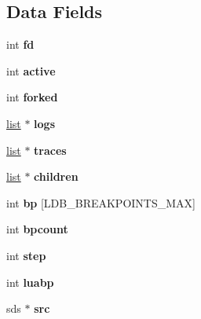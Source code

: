 \subsection*{Data Fields}
\begin{DoxyCompactItemize}
\item 
\mbox{\label{structldbState_a9cfd131ac4a3d413728eed06a3ab00c0}} 
int {\bfseries fd}
\item 
\mbox{\label{structldbState_a239930111a8210b0fdf469aa188169f5}} 
int {\bfseries active}
\item 
\mbox{\label{structldbState_a4eafad805a1920b9c74ab5d8aae75f1b}} 
int {\bfseries forked}
\item 
\mbox{\label{structldbState_ad3f673e02a95895965ed27bb0a9df1da}} 
\hyperlink{structlist}{list} $\ast$ {\bfseries logs}
\item 
\mbox{\label{structldbState_aab7c5fd73a0e8d3c1d145b17e93136fc}} 
\hyperlink{structlist}{list} $\ast$ {\bfseries traces}
\item 
\mbox{\label{structldbState_a2aa1fb7c2ea304eceb834d64fee94e6c}} 
\hyperlink{structlist}{list} $\ast$ {\bfseries children}
\item 
\mbox{\label{structldbState_a09bf432c2f20a9644b5ac6dc49799102}} 
int {\bfseries bp} \mbox{[}L\+D\+B\+\_\+\+B\+R\+E\+A\+K\+P\+O\+I\+N\+T\+S\+\_\+\+M\+AX\mbox{]}
\item 
\mbox{\label{structldbState_aac1c2436f5bc19b54803961e4cb23eae}} 
int {\bfseries bpcount}
\item 
\mbox{\label{structldbState_ad057b073b09629cb6ebc327974f561ed}} 
int {\bfseries step}
\item 
\mbox{\label{structldbState_a068c057bfe488a40051a32ae8cddd5e3}} 
int {\bfseries luabp}
\item 
\mbox{\label{structldbState_a2d752e55a6005c1668afc18e63157dfa}} 
sds $\ast$ {\bfseries src}
\item 

\end{DoxyCompactItemize}
